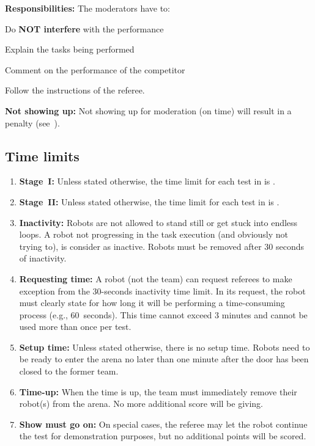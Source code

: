 \noindent\textbf{Responsibilities:} The moderators have to:
\begin{compactitem}
	\item Do \textbf{NOT interfere} with the performance
	\item Explain the tasks being performed
	\item Comment on the performance of the competitor
	\item Follow the instructions of the referee.
\end{compactitem}

\noindent \textbf{Not showing up:} Not showing up for moderation (on time) will result in a penalty (see~).


\subsection{Time limits}
\label{rule:time_limits}
\begin{enumerate}
	\item \textbf{Stage~I:} Unless stated otherwise, the time limit for each test in  is .

	\item \textbf{Stage~II:} Unless stated otherwise, the time limit for each test in  is .

	\item \textbf{Inactivity:} Robots are not allowed to stand still or get stuck into endless loops.
	A robot not progressing in the task execution (and obviously not trying to), is consider as inactive.
	Robots must be removed after 30 seconds of inactivity.

	\item \textbf{Requesting time:} A robot (not the team) can request referees to make exception from the 30-seconds inactivity time limit.
	In its request, the robot must clearly state for how long it will be performing a time-consuming process (e.g., 60~seconds).
	This time cannot exceed 3 minutes and cannot be used more than once per test.

	\item \textbf{Setup time:} Unless stated otherwise, there is no setup time.
	Robots need to be ready to enter the arena no later than one minute after the door has been closed to the former team.

	\item \textbf{Time-up:} When the time is up, the team must immediately remove their robot(s) from the arena.
	No more additional score will be giving.

	\item \textbf{Show must go on:} On special cases, the referee may let the robot continue the test for demonstration purposes, but no additional points will be scored.
\end{enumerate}



